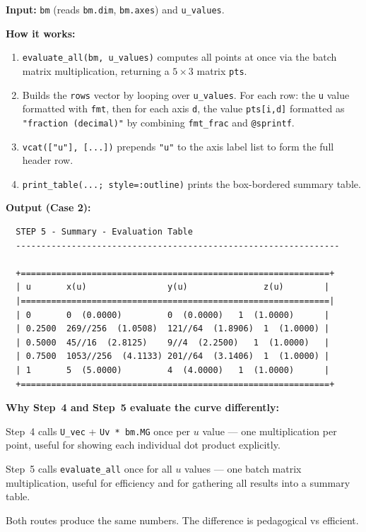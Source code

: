 \documentclass[12pt, a4paper]{article}
\newcommand{\cd}[1]{\texttt{#1}}
\begin{document}
\textbf{Input:} \cd{bm} (reads \cd{bm.dim}, \cd{bm.axes})
and \cd{u\_values}.

\textbf{How it works:}

\begin{enumerate}
  \item \cd{evaluate\_all(bm, u\_values)} computes all points
        at once via the batch matrix multiplication,
        returning a $5 \times 3$ matrix \cd{pts}.
  \item Builds the \cd{rows} vector by looping over
        \cd{u\_values}.
        For each row: the \cd{u} value formatted with \cd{fmt},
        then for each axis \cd{d}, the value \cd{pts[i,d]}
        formatted as \cd{"fraction  (decimal)"} by combining
        \cd{fmt\_frac} and \cd{@sprintf}.
  \item \cd{vcat(["u"], [...])} prepends \cd{"u"} to the
        axis label list to form the full header row.
  \item \cd{print\_table(...; style=:outline)} prints the
        box-bordered summary table.
\end{enumerate}

\textbf{Output (Case 2):}
\begin{verbatim}
  STEP 5 - Summary - Evaluation Table
  ----------------------------------------------------------------

  +=============================================================+
  | u       x(u)                y(u)               z(u)        |
  |=============================================================|
  | 0       0  (0.0000)         0  (0.0000)   1  (1.0000)      |
  | 0.2500  269//256  (1.0508)  121//64  (1.8906)  1  (1.0000) |
  | 0.5000  45//16  (2.8125)    9//4  (2.2500)   1  (1.0000)   |
  | 0.7500  1053//256  (4.1133) 201//64  (3.1406)  1  (1.0000) |
  | 1       5  (5.0000)         4  (4.0000)   1  (1.0000)      |
  +=============================================================+
\end{verbatim}

\begin{notebox}
\textbf{Why Step~4 and Step~5 evaluate the curve differently:}

Step~4 calls \cd{U\_vec} + \cd{Uv * bm.MG} once per $u$ value ---
one multiplication per point, useful for showing each
individual dot product explicitly.

Step~5 calls \cd{evaluate\_all} once for all $u$ values ---
one batch matrix multiplication, useful for efficiency
and for gathering all results into a summary table.

Both routes produce the same numbers.
The difference is pedagogical vs efficient.
\end{notebox}
\end{document}
